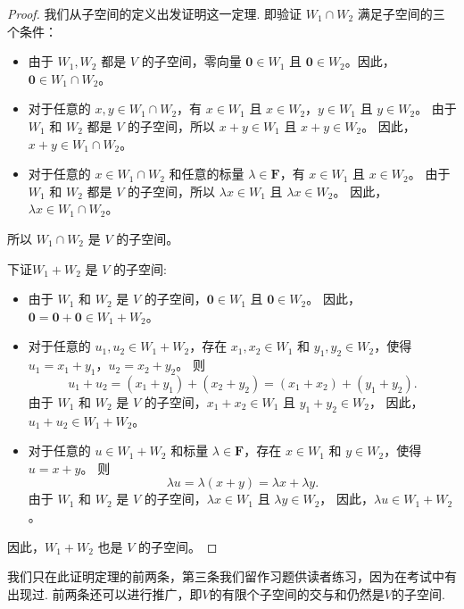\begin{proof}
    我们从子空间的定义出发证明这一定理.
    即验证 $W_1 \cap W_2$ 满足子空间的三个条件：


    \begin{itemize}
        \item
        由于 $W_1, W_2$ 都是 $V$ 的子空间，零向量 $\mathbf{0} \in W_1$ 且 $\mathbf{0} \in W_2$。因此，$\mathbf{0} \in W_1 \cap W_2$。

        \item
        对于任意的 $x, y \in W_1 \cap W_2$，有 $x \in W_1$ 且 $x \in W_2$，$y \in W_1$ 且 $y \in W_2$。
        由于 $W_1$ 和 $W_2$ 都是 $V$ 的子空间，所以 $x + y \in W_1$ 且 $x + y \in W_2$。
        因此，$x + y \in W_1 \cap W_2$。

        \item
        对于任意的 $x \in W_1 \cap W_2$ 和任意的标量 $\lambda \in \mathbf{F}$，有 $x \in W_1$ 且 $x \in W_2$。
        由于 $W_1$ 和 $W_2$ 都是 $V$ 的子空间，所以 $\lambda x \in W_1$ 且 $\lambda x \in W_2$。
        因此，$\lambda x \in W_1 \cap W_2$。
    \end{itemize}

    所以 $W_1 \cap W_2$ 是 $V$ 的子空间。


    下证$W_1 + W_2$ 是 $V$ 的子空间:
    \begin{itemize}
        \item
        由于 $W_1$ 和 $W_2$ 是 $V$ 的子空间，$\mathbf{0} \in W_1$ 且 $\mathbf{0} \in W_2$。
        因此，$\mathbf{0} = \mathbf{0} + \mathbf{0} \in W_1 + W_2$。

        \item
        对于任意的 $u_1, u_2 \in W_1 + W_2$，存在 $x_1, x_2 \in W_1$ 和 $y_1, y_2 \in W_2$，使得 $u_1 = x_1 + y_1$，$u_2 = x_2 + y_2$。
        则
        $$
        u_1 + u_2 = (x_1 + y_1) + (x_2 + y_2) = (x_1 + x_2) + (y_1 + y_2).
        $$
        由于 $W_1$ 和 $W_2$ 是 $V$ 的子空间，$x_1 + x_2 \in W_1$ 且 $y_1 + y_2 \in W_2$，
        因此，$u_1 + u_2 \in W_1 + W_2$。

        \item
        对于任意的 $u \in W_1 + W_2$ 和标量 $\lambda \in \mathbf{F}$，存在 $x \in W_1$ 和 $y \in W_2$，使得 $u = x + y$。
        则
        $$
        \lambda u = \lambda (x + y) = \lambda x + \lambda y.
        $$
        由于 $W_1$ 和 $W_2$ 是 $V$ 的子空间，$\lambda x \in W_1$ 且 $\lambda y \in W_2$，
        因此，$\lambda u \in W_1 + W_2$。
    \end{itemize}

    因此，$W_1 + W_2$ 也是 $V$ 的子空间。
\end{proof}
我们只在此证明定理的前两条，第三条我们留作习题供读者练习，因为在考试中有出现过. 前两条还可以进行推广，即$V$的有限个子空间的交与和仍然是$V$的子空间.

